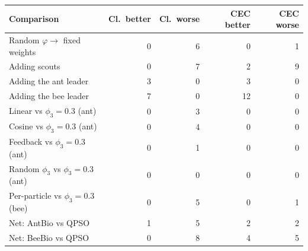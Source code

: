 \begin{tabular}{lrrrr}
\toprule
Comparison & Cl.\ better & Cl.\ worse & CEC better & CEC worse \\
\midrule
Random $\varphi\to$ fixed weights & 0 & 6 & 0 & 1 \\
Adding scouts & 0 & 7 & 2 & 9 \\
Adding the ant leader & 3 & 0 & 3 & 0 \\
Adding the bee leader & 7 & 0 & 12 & 0 \\
\midrule
Linear vs $\phi_3=0.3$ (ant) & 0 & 3 & 0 & 0 \\
Cosine vs $\phi_3=0.3$ (ant) & 0 & 4 & 0 & 0 \\
Feedback vs $\phi_3=0.3$ (ant) & 0 & 1 & 0 & 0 \\
Random $\phi_3$ vs $\phi_3=0.3$ (ant) & 0 & 0 & 0 & 0 \\
Per-particle vs $\phi_3=0.3$ (bee) & 0 & 5 & 0 & 1 \\
\midrule
Net: AntBio vs QPSO & 1 & 5 & 2 & 2 \\
Net: BeeBio vs QPSO & 0 & 8 & 4 & 5 \\
\bottomrule
\end{tabular}
